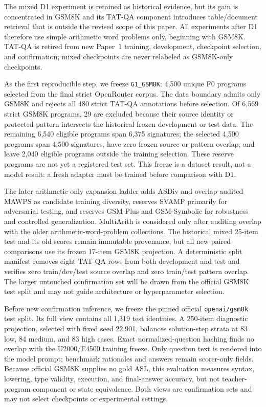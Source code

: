 \documentclass[11pt]{article}
\begin{document}
The mixed D1 experiment is retained as historical evidence, but its gain is
concentrated in GSM8K and its TAT-QA component introduces table/document
retrieval that is outside the revised scope of this paper. All experiments
after D1 therefore use simple arithmetic word problems only, beginning with
GSM8K. TAT-QA is retired from new Paper~1 training, development, checkpoint
selection, and confirmation; mixed checkpoints are never relabeled as
GSM8K-only checkpoints.

As the first reproducible step, we freeze \texttt{G1\_GSM8K}: 4,500 unique F0
programs selected from the final strict OpenRouter corpus. The data boundary
admits only GSM8K and rejects all 480 strict TAT-QA annotations before
selection. Of 6,569 strict GSM8K programs, 29 are excluded because their source
identity or protected pattern intersects the historical frozen development or
test data. The remaining 6,540 eligible programs span 6,375 signatures; the
selected 4,500 programs span 4,500 signatures, have zero frozen source or
pattern overlap, and leave 2,040 eligible programs outside the training
selection. These reserve programs are not yet a registered test set. This
freeze is a dataset result, not a model result: a fresh adapter must be trained
before comparison with D1.

The later arithmetic-only expansion ladder adds ASDiv and overlap-audited MAWPS
as candidate training diversity, reserves SVAMP primarily for adversarial
testing, and reserves GSM-Plus and GSM-Symbolic for robustness and controlled
generalization. MultiArith is considered only after auditing overlap with the
older arithmetic-word-problem collections. The historical mixed 25-item test
and its old scores remain immutable provenance, but all new paired comparisons
use its frozen 17-item GSM8K projection. A deterministic split manifest removes
eight TAT-QA rows from both development and test and verifies zero train/dev/test
source overlap and zero train/test pattern overlap. The larger untouched
confirmation set will be drawn from the official GSM8K test split and may not
guide architecture or hyperparameter selection.

Before new confirmation inference, we freeze the pinned official
\texttt{openai/gsm8k} test split. Its full view contains all 1,319 test
identities. A 250-item diagnostic projection, selected with fixed seed 22,901,
balances solution-step strata at 83 low, 84 medium, and 83 high cases. Exact
normalized-question hashing finds no overlap with the U2000/E4500 training
freeze. Only question text is rendered into the model prompt; benchmark
rationales and answers remain scorer-only fields. Because official GSM8K
supplies no gold ASL, this evaluation measures syntax, lowering, type validity,
execution, and final-answer accuracy, but not teacher-program component or
state equivalence. Both views are confirmation sets and may not select
checkpoints or experimental settings.
\end{document}
